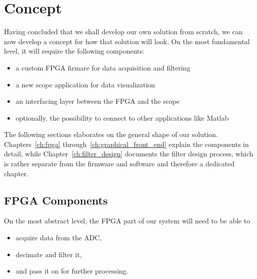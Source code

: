 

\section{Concept} %
\label{sec:mission:concept}

Having concluded that  we shall develop our own solution  from scratch, we can
now  develop  a  concept  for  how  that solution  will  look.   On  the  most
fundamental level, it will require the following components:
\begin{itemize}
    \item
        a custom FPGA firmare for data acquisition and filtering
    \item
        a new scope application for data visualization
    \item
        an interfacing layer between the FPGA and the scope
    \item
        optionally, the possibility to connect to other applications like Matlab
\end{itemize}
The   following   sections   elaborates   on  the   general   shape   of   our
solution. Chapters~\ref{ch:fpga}  through~\ref{ch:graphical_front_end} explain
the components  in detail, while Chapter~\ref{ch:filter_design}  documents the
filter design process, which is rather separate from the firmware and software
and therefore a dedicated chapter.


\subsection{FPGA Components} %
\label{subsec:concept:fpga_components}

On the most abstract level, the FPGA part of our system will need to be able to
\begin{itemize}\tightlist
    \item
        acquire data from the ADC,
    \item
        decimate and filter it,
    \item
        and pass it on for further processing.
\end{itemize}

